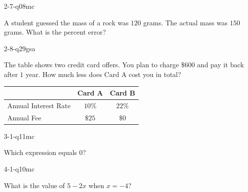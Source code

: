 \begin{practiceQuestion}{2-7-q08}{mc}
\begin{questionText}
A student guessed the mass of a rock was $120$ grams. The actual mass was $150$ grams. What is the percent error?
\end{questionText}
\end{practiceQuestion}

\begin{practiceQuestion}{2-8-q29}{gsa}
\begin{questionText}
The table shows two credit card offers. You plan to charge $\$600$ and pay it back after $1$ year. How much less does Card A cost you in total?

\begin{center}
\begin{tabular}{|l|c|c|}
\hline
 & \textbf{Card A} & \textbf{Card B} \\
\hline
Annual Interest Rate & $10\%$ & $22\%$ \\
\hline
Annual Fee & $\$25$ & $\$0$ \\
\hline
\end{tabular}
\end{center}
\end{questionText}
\end{practiceQuestion}

\begin{practiceQuestion}{3-1-q11}{mc}
\begin{questionText}
Which expression equals $0$?
\end{questionText}
\end{practiceQuestion}

\begin{practiceQuestion}{4-1-q10}{mc}
\begin{questionText}
What is the value of $5 - 2x$ when $x = -4$?
\end{questionText}
\end{practiceQuestion}

